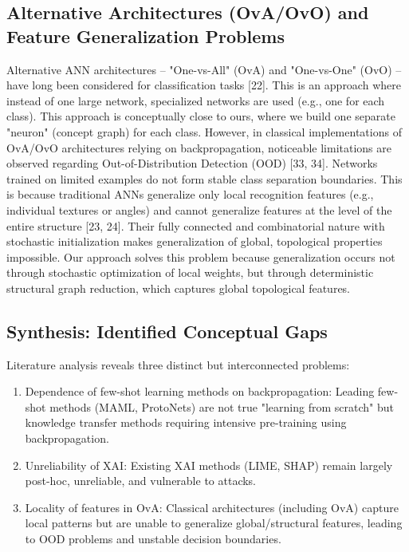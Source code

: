\documentclass[conference]{IEEEtran}
\begin{document}
\subsection{Alternative Architectures (OvA/OvO) and Feature Generalization Problems}
Alternative ANN architectures -- "One-vs-All" (OvA) and "One-vs-One" (OvO) -- have long been considered for classification tasks [22]. This is an approach where instead of one large network, specialized networks are used (e.g., one for each class). This approach is conceptually close to ours, where we build one separate "neuron" (concept graph) for each class. However, in classical implementations of OvA/OvO architectures relying on backpropagation, noticeable limitations are observed regarding Out-of-Distribution Detection (OOD) [33, 34]. Networks trained on limited examples do not form stable class separation boundaries. This is because traditional ANNs generalize only local recognition features (e.g., individual textures or angles) and cannot generalize features at the level of the entire structure [23, 24]. Their fully connected and combinatorial nature with stochastic initialization makes generalization of global, topological properties impossible. Our approach solves this problem because generalization occurs not through stochastic optimization of local weights, but through deterministic structural graph reduction, which captures global topological features.

\subsection{Synthesis: Identified Conceptual Gaps}
Literature analysis reveals three distinct but interconnected problems:
\begin{enumerate}
    \item Dependence of few-shot learning methods on backpropagation: Leading few-shot methods (MAML, ProtoNets) are not true "learning from scratch" but knowledge transfer methods requiring intensive pre-training using backpropagation.
    \item Unreliability of XAI: Existing XAI methods (LIME, SHAP) remain largely post-hoc, unreliable, and vulnerable to attacks.
    \item Locality of features in OvA: Classical architectures (including OvA) capture local patterns but are unable to generalize global/structural features, leading to OOD problems and unstable decision boundaries.
\end{enumerate}
\end{document}
